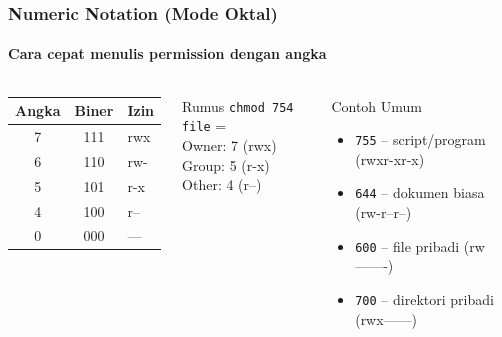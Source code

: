 \documentclass[t,aspectratio=169,xcolor=dvipsnames]{beamer}
\begin{document}
\begin{frame}[shrink=5]
    \frametitle{Numeric Notation (Mode Oktal)}
    \framesubtitle{Cara cepat menulis permission dengan angka}

    \begin{columns}[T]
        \begin{center}
            \begin{tabular}{ccl}
                \toprule
                \textbf{Angka} & \textbf{Biner} & \textbf{Izin} \\
                \midrule
                7 & 111 & rwx \\
                6 & 110 & rw- \\
                5 & 101 & r-x \\
                4 & 100 & r-- \\
                0 & 000 & --- \\
                \bottomrule
            \end{tabular}
        \end{center}

        \begin{block}{Rumus}
            \small
            \texttt{chmod 754 file} = \\
            Owner: 7 (rwx) \\
            Group: 5 (r-x) \\
            Other: 4 (r--)
        \end{block}

        \vspace{0.2cm}
        \begin{exampleblock}{Contoh Umum}
            \small
            \begin{itemize}
                \item \texttt{755} -- script/program (rwxr-xr-x)
                \item \texttt{644} -- dokumen biasa (rw-r--r--)
                \item \texttt{600} -- file pribadi (rw-------)
                \item \texttt{700} -- direktori pribadi (rwx------)
            \end{itemize}
        \end{exampleblock}
    \end{columns}
\end{frame}
\end{document}
